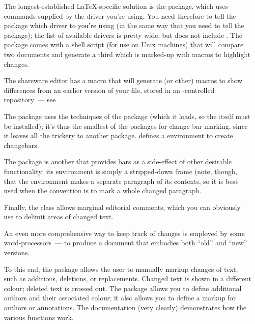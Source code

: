 The longest-established \LaTeX{}-specific solution is the
 package,
which uses  commands supplied by the driver you're using.
You need therefore to tell the package which driver to you're using
(in the same way that you need to tell the 
package); the list of available drivers is pretty
wide, but does not include .  The package comes with
a shell script  (for use on Unix machines) that
will compare two documents and generate a third which is marked-up
with  macros to highlight changes.

The shareware  editor has a macro that will generate
 (or other) macros to show differences from an
earlier version of your file, stored in an -controlled
repository~--- see

The  package uses the techniques of the
 package (which it loads, so the 
itself must be installed); it's thus the smallest of the packages for
change bar marking, since it leaves all the trickery to another
package.   defines a 
environment to create changebars.

The  package is
another that provides bars as a side-effect of other desirable
functionality: its  environment is simply a
stripped-down frame (note, though, that the environment makes a
separate paragraph of its contents, so it is best used when the
convention is to mark a whole changed paragraph.

Finally, the  class allows marginal editorial comments,
which you can obviously use to delimit areas of changed text.

An even more comprehensive way to keep track of changes is employed by
some word-processors~--- to produce a document that embodies both
``old'' and ``new'' versions.

To this end, the package  allows the user to manually
markup changes of text, such as additions, deletions, or replacements.
Changed text is shown in a different colour; deleted text is crossed
out.  The package allows you to define additional authors and their
associated colour; it also allows you to define a markup for authors
or annotations.  The documentation (very clearly) demonstrates how the
various functions work.

